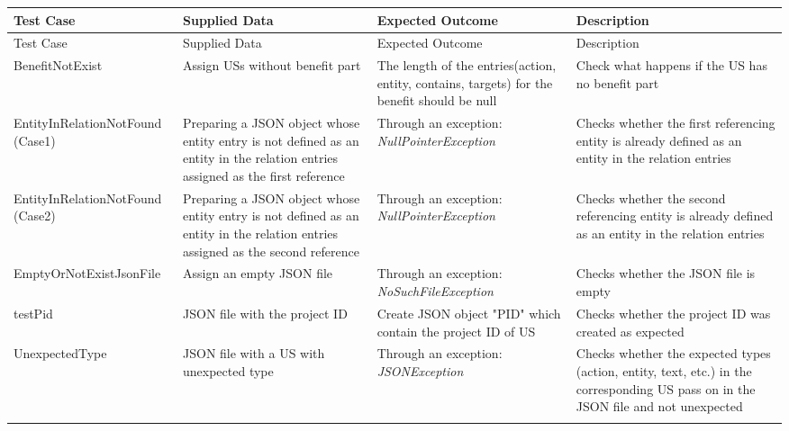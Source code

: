 	\begin{tabularx}{\textwidth}{X  X  X  X}
	\hline
	Test Case &Supplied Data&Expected Outcome&Description\\
	\hline\hline
	\endfirsthead
	\hline
	Test Case &Supplied Data&Expected Outcome&Description\\
	\hline\hline
	\endhead
		BenefitNotExist&Assign USs without benefit part&The length of the entries(action, entity, contains, targets) for the benefit should be null&Check what happens if the US has no benefit part\\
		
		EntityInRelationNotFound \newline(Case1)&Preparing a JSON object whose entity entry is not defined as an entity in the relation entries assigned as the first reference&Through an exception: \textit{NullPointerException}&Checks whether the first referencing entity is already defined as an entity in the relation entries\\
		
		
		EntityInRelationNotFound \newline(Case2)&Preparing a JSON object whose entity entry is not defined as an entity in the relation entries assigned as the second reference&Through an exception: \textit{NullPointerException}&Checks whether the second referencing entity is already defined as an entity in the relation entries\\
		
		EmptyOrNotExistJsonFile&Assign an empty JSON file&Through an exception: \textit{NoSuchFileException}&Checks whether the JSON file is empty\\
		
		testPid&JSON file with the project ID&Create JSON object "PID" which contain the project ID of US&Checks whether the project ID was created as expected\\
		
		UnexpectedType&JSON file with a US with unexpected type&Through an exception: \textit{JSONException}&Checks whether the expected types (action, entity, text, etc.) in the corresponding US pass on in the JSON file and not unexpected\\
		
		
		\hline
		\caption{Test cases for USPartExtractor  class}\label{tb:test_cases_json_transformer}
	\end{tabularx}
\endgroup

